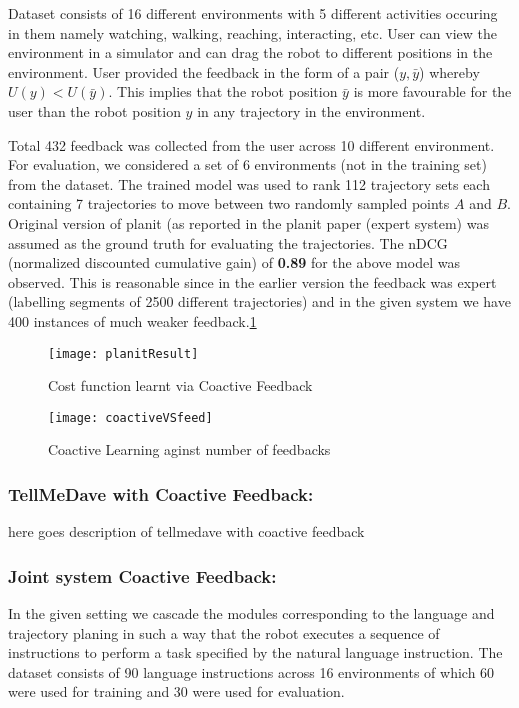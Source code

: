		Dataset consists of 16 different environments with 5 different activities occuring in them namely watching, walking, reaching, interacting, etc. User can view the environment in a simulator and can drag the robot to different positions in the environment. User provided the feedback in the form of a pair ($y,\bar{y}$) whereby $U(y) < U(\bar{y})$. This implies that the robot position $\bar{y}$ is more favourable for the user than the robot position $y$ in any trajectory in the environment. 

		Total 432 feedback was collected from the user across 10 different environment. For evaluation, we considered a set of 6 environments (not in the training set) from the dataset. The trained model was used to rank 112 trajectory sets each containing 7 trajectories to move between two randomly sampled points $A$ and $B$. Original version of planit (as reported in the planit paper (expert system) was assumed as the ground truth for evaluating the trajectories. The nDCG (normalized discounted cumulative gain) of \textbf{0.89} for the above model was observed. This is reasonable since in the earlier version the feedback was expert (labelling segments of 2500 different trajectories) and in the given system we have 400 instances of much weaker feedback.\ref{fig:planitResult} 


		
		\begin{figure}[h]
		\texttt{[image: planitResult]}
		\centering
		\caption{Cost function learnt via Coactive Feedback}
  		\label{fig:planitResult}
		\end{figure}


		\begin{figure}[h]
		\texttt{[image: coactiveVSfeed]}
		\centering
		\caption{Coactive Learning aginst number of feedbacks}
  		\label{fig:c1}
		\end{figure}
	\subsubsection{TellMeDave with Coactive Feedback:} 
		here goes description of tellmedave with coactive feedback

	\subsubsection{Joint system Coactive Feedback:}
	In the given setting we cascade the modules corresponding to the language and trajectory planing in such a way that the robot executes a sequence of instructions to perform a task specified by the natural language instruction. The dataset consists of 90 language instructions across 16 environments of which 60 were used for training and 30 were used for evaluation.

